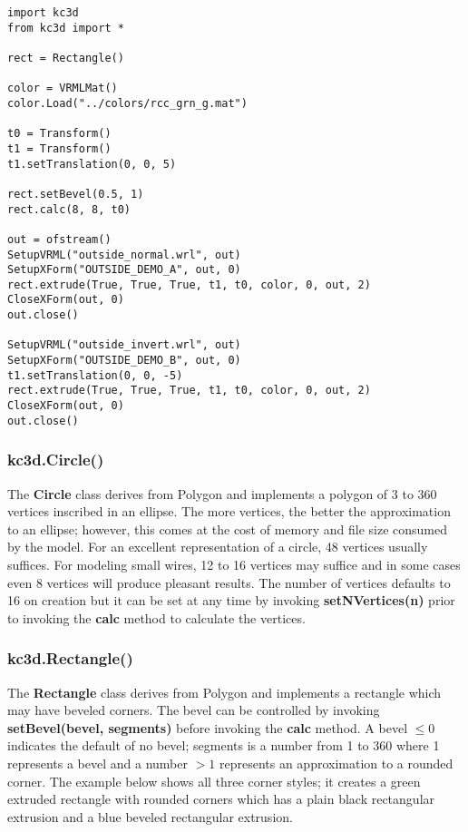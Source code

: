 \documentclass[a4paper, dvipdfm]{article}
\begin{document}
\begin{verbatim}
import kc3d
from kc3d import *

rect = Rectangle()

color = VRMLMat()
color.Load("../colors/rcc_grn_g.mat")

t0 = Transform()
t1 = Transform()
t1.setTranslation(0, 0, 5)

rect.setBevel(0.5, 1)
rect.calc(8, 8, t0)

out = ofstream()
SetupVRML("outside_normal.wrl", out)
SetupXForm("OUTSIDE_DEMO_A", out, 0)
rect.extrude(True, True, True, t1, t0, color, 0, out, 2)
CloseXForm(out, 0)
out.close()

SetupVRML("outside_invert.wrl", out)
SetupXForm("OUTSIDE_DEMO_B", out, 0)
t1.setTranslation(0, 0, -5)
rect.extrude(True, True, True, t1, t0, color, 0, out, 2)
CloseXForm(out, 0)
out.close()
\end{verbatim}

\subsubsection{kc3d.Circle()}
\label{sec:kc3dCircle}
The \textbf{Circle} class derives from Polygon and implements a polygon of
3 to 360 vertices inscribed in an ellipse.  The more vertices, the better the approximation
to an ellipse; however, this comes at the cost of memory and file size consumed by the
model.  For an excellent representation of a circle, 48 vertices usually suffices. For
modeling small wires, 12 to 16 vertices may suffice and in some cases even 8 vertices
will produce pleasant results. The number of vertices defaults to 16 on creation
but it can be set at any time by invoking \textbf{setNVertices(n)} prior to invoking
the \textbf{calc} method to calculate the vertices.

\subsubsection{kc3d.Rectangle()}
The \textbf{Rectangle} class derives from Polygon and implements a rectangle which
may have beveled corners. The bevel can be controlled by invoking \textbf{setBevel(bevel, segments)}
before invoking the \textbf{calc} method. A bevel $\le0$ indicates the default of no bevel; segments
is a number from 1 to 360 where 1 represents a bevel and a number $>1$ represents an approximation to
a rounded corner.  The example below shows all three corner styles; it creates a green extruded
rectangle with rounded corners which has a plain black rectangular extrusion and a blue
beveled rectangular extrusion.
\end{document}
